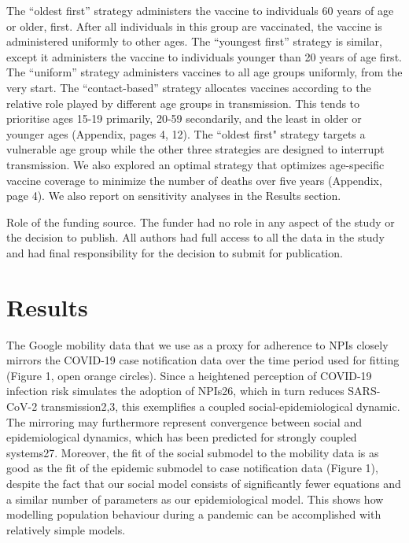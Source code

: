 The “oldest first” strategy administers the vaccine to individuals 60 years of age or older, first.  After all individuals in this group are vaccinated, the vaccine is administered uniformly to other ages. The “youngest first” strategy is similar, except it administers the vaccine to individuals younger than 20 years of age first.  The “uniform” strategy administers vaccines to all age groups uniformly, from the very start. The “contact-based” strategy allocates vaccines according to the relative role played by different age groups in transmission. This tends to prioritise ages 15-19 primarily, 20-59 secondarily, and the least in older or younger ages (Appendix, pages 4, 12).  The ``oldest first" strategy targets a vulnerable age group while the other three strategies are designed to interrupt transmission.  We also explored an optimal strategy that optimizes age-specific vaccine coverage to minimize the number of deaths over five years (Appendix, page 4). We also report on sensitivity analyses in the Results section. 

Role of the funding source. The funder had no role in any aspect of the study or the decision to publish. All authors had full access to all the data in the study and had final responsibility for the decision to submit for publication.

\section{Results} 

The Google mobility data that we use as a proxy for adherence to NPIs closely mirrors the COVID-19 case notification data over the time period used for fitting (Figure 1, open orange circles).  Since a heightened perception of COVID-19 infection risk simulates the adoption of NPIs26, which in turn reduces SARS-CoV-2 transmission2,3, this exemplifies a coupled  social-epidemiological dynamic.  The mirroring may furthermore represent convergence between social and epidemiological dynamics, which has been predicted for strongly coupled systems27. Moreover, the fit of the social submodel to the mobility data is as good as the fit of the epidemic submodel to case notification data (Figure 1), despite the fact that our social model consists of significantly fewer equations and a similar number of parameters as our epidemiological model. This shows how modelling population behaviour during a pandemic can be accomplished with relatively simple models. 

